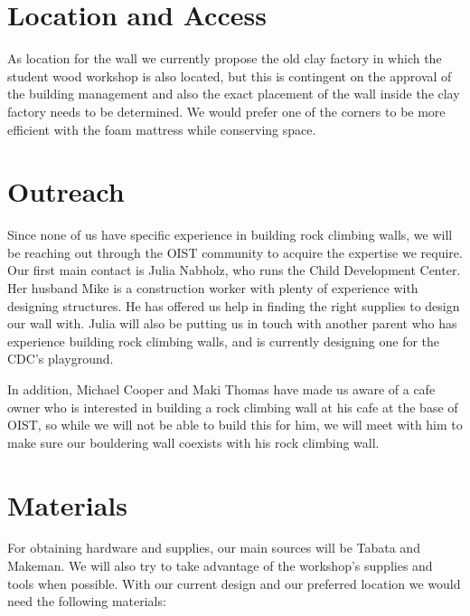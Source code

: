 \documentclass{scrartcl}
\begin{document}
\section{Location and Access}
As location for the wall we currently propose the old clay factory in which the student wood workshop is also located, but this is contingent on the approval of the building management and also the exact placement of the wall inside the clay factory needs to be determined. We would prefer one of the corners to be more efficient with the foam mattress while conserving space.
\section{Outreach}
Since none of us have specific experience in building rock climbing walls, we will be reaching out through the OIST community to acquire the expertise we require. Our first main contact is Julia Nabholz, who runs the Child Development Center. Her husband Mike is a construction worker with plenty of experience with designing structures. He has offered us help in finding the right supplies to design our wall with. Julia will also be putting us in touch with another parent who has experience building rock climbing walls, and is currently designing one for the CDC's playground.

In addition, Michael Cooper and Maki Thomas have made us aware of a cafe owner who is interested in building a rock climbing wall at his cafe at the base of OIST, so while we will not be able to build this for him, we will meet with him to make sure our bouldering wall coexists with his rock climbing wall.

\section{Materials}
For obtaining hardware and supplies, our main sources will be Tabata and Makeman. We will also try to take advantage of the workshop’s supplies and tools when possible.
With our current design and our preferred location we would need the following materials:
\end{document}
